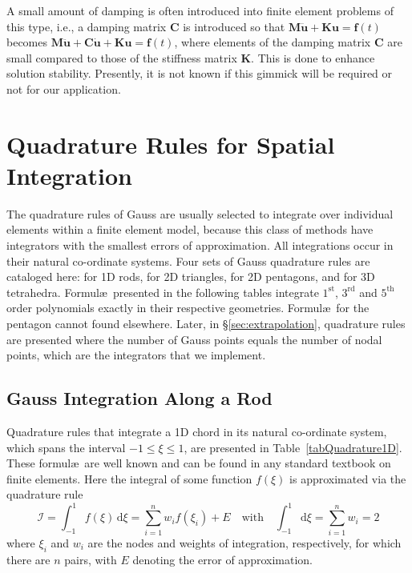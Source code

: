 A small amount of damping is often introduced into finite element problems of this type, i.e., a damping matrix $\mathbf{C}$ is introduced so that $\mathbf{M}\ddot{\mathbf{u}} + \mathbf{Ku} = \mathbf{f}(t)$ becomes $\mathbf{M}\ddot{\mathbf{u}} + \mathbf{C}\dot{\mathbf{u}} + \mathbf{Ku} = \mathbf{f}(t)$, where elements of the damping matrix $\mathbf{C}$ are small compared to those of the stiffness matrix $\mathbf{K}$.  This is done to enhance solution stability.  Presently, it is not known if this gimmick will be required or not for our application.

\section{Quadrature Rules for Spatial Integration}
\label{secGauss}

The quadrature rules of Gauss are usually selected to integrate over individual elements within a finite element model, because this class of methods have integrators with the smallest errors of approximation.   All integrations occur in their natural co-ordinate systems.   Four sets of Gauss quadrature rules are cataloged here: for 1D rods, for 2D triangles, for 2D pentagons, and for 3D tetrahedra.  Formul\ae\ presented in the following tables integrate $1^{\text{st}}$, $3^{\text{rd}}$ and $5^{\text{th}}$ order polynomials exactly in their respective geometries.  Formul\ae\ for the pentagon cannot found elsewhere.  Later, in \S\ref{sec:extrapolation}, quadrature rules are presented where the number of Gauss points equals the number of nodal points, which are the integrators that we implement.

\subsection{Gauss Integration Along a Rod}

Quadrature rules that integrate a 1D chord in its natural co-ordinate system, which spans the interval $-1 \leq \xi \leq 1$, are presented in Table~\ref{tabQuadrature1D}.  These formul\ae\ are well known and can be found in any standard textbook on finite elements.  Here the integral of some function $f( \xi )$ is approximated via the quadrature rule
\begin{equation}
    \mathcal{I} = \int_{-1}^1 f ( \xi ) \, \mathrm{d} \xi 
    = \sum_{i=1}^n w_i f( \xi_i ) + E
    \quad \text{with} \quad
    \int_{-1}^1 \mathrm{d} \xi = \sum_{i=1}^n w_i = 2
    \label{Gauss1D}
\end{equation}
where $\xi_i$ and $w_i$ are the nodes and weights of integration, respectively, for which there are $n$ pairs, with $E$ denoting the error of approximation.

